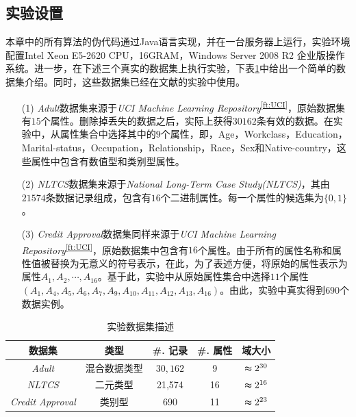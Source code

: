 \subsection{实验设置}
  本章中的所有算法的伪代码通过Java语言实现，并在一台服务器上运行，实验环境配置Intel Xeon E5-2620 CPU，16GRAM，Windows Server 2008 R2 企业版操作系统。进一步，在下述三个真实的数据集上执行实验，下表\ref{table:datasets}中给出一个简单的数据集介绍。同时，这些数据集已经在文献的实验中使用。
 \begin{itemize}
 	\item [(1)] {\em Adult}数据集来源于{\em UCI Machine Learning Repository}\textsuperscript{\ref{ft:UCI}}，原始数据集有$15$个属性。删除掉丢失的数据之后，实际上获得$30162$条有效的数据。在实验中，从属性集合中选择其中的$9$个属性，即，Age，Workclass，Education，Marital-status，Occupation，Relationship，Race，Sex和Native-country，这些属性中包含有数值型和类别型属性。
 	
 	\item[(2)]{\em NLTCS}数据集来源于{\em National Long-Term Case Study(NLTCS)}，其由$21574$条数据记录组成，包含有$16$个二进制属性\cite{zhu2015correlated}。每一个属性的候选集为$\{0,1\}$。
 	
 	\item [(3)]{\em Credit Approval}数据集同样来源于{\em UCI Machine Learning Repository}\textsuperscript{\ref{ft:UCI}}，原始数据集中包含有$16$个属性。由于所有的属性名称和属性值被替换为无意义的符号表示，在此，为了表述方便，将原始的属性表示为属性$A_1,A_2,\cdots,A_{16}$。基于此，实验中从原始属性集合中选择$11$个属性$(A_1,A_4,A_5,A_6,A_7,A_9,A_{10},A_{11},A_{12},A_{13},A_{16})$。由此，实验中真实得到$690$个数据实例。
 \end{itemize}

\begin{table}[htb]\centering\caption{实验数据集描述}\label{table:datasets}
\small
\begin{tabular}{|c|c|c|c|c|}
  \hline
 \textbf{数据集} & \textbf{类型} & \textbf{\#. 记录} & \textbf{\#. 属性} & \textbf{域大小}\\
  \hline
  {\em Adult} & 混合数据类型 & $30,162$ & 9 & $\thickapprox 2^{30}$ \\
  {\em NLTCS} & 二元类型& 21,574 & 16 & $\thickapprox 2^{16}$ \\
  {\em Credit Approval} & 类别型 & 690 & 11 & $\thickapprox 2^{23}$ \\
  \hline
\end{tabular}
\end{table}



